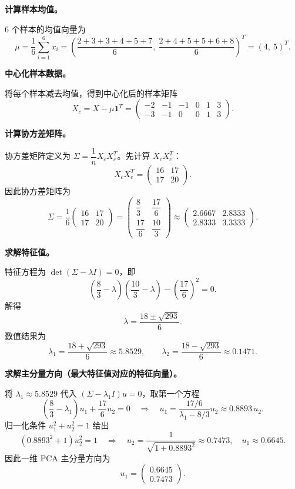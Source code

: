 \documentclass[a4, 10pt, comentarios]{aleph-notas}
\begin{document}
\textbf{计算样本均值。}

6 个样本的均值向量为
\[
    \mu=\frac{1}{6}\sum_{i=1}^{6}x_i
    =\left(\frac{2+3+3+4+5+7}{6},\ \frac{2+4+5+5+6+8}{6}\right)^T
    =\left(4,\ 5\right)^T.
\]

\textbf{中心化样本数据。}

将每个样本减去均值，得到中心化后的样本矩阵
\[
X_c=X-\mu\mathbf{1}^T=
\begin{pmatrix}
-2&-1&-1&0&1&3\\
-3&-1&0&0&1&3
\end{pmatrix}.
\]

\textbf{计算协方差矩阵。}

协方差矩阵定义为 $\Sigma=\dfrac{1}{n}X_cX_c^T$。先计算 $X_cX_c^T$：
\[
X_cX_c^T=
\begin{pmatrix}
16 & 17\\
17 & 20
\end{pmatrix}.
\]
因此协方差矩阵为
\[
\Sigma=\frac{1}{6}
\begin{pmatrix}
16 & 17\\
17 & 20
\end{pmatrix}
=
\begin{pmatrix}
\dfrac{8}{3} & \dfrac{17}{6}\\[6pt]
\dfrac{17}{6} & \dfrac{10}{3}
\end{pmatrix}
\approx
\begin{pmatrix}
2.6667 & 2.8333\\
2.8333 & 3.3333
\end{pmatrix}.
\]

\textbf{求解特征值。}

特征方程为 $\det(\Sigma-\lambda I)=0$，即
\[
\left(\frac{8}{3}-\lambda\right)\left(\frac{10}{3}-\lambda\right)-\left(\frac{17}{6}\right)^2=0.
\]
解得
\[
\lambda=\frac{18\pm\sqrt{293}}{6}.
\]
数值结果为
\[
\lambda_1=\frac{18+\sqrt{293}}{6}\approx5.8529,\qquad
\lambda_2=\frac{18-\sqrt{293}}{6}\approx0.1471.
\]

\textbf{求解主分量方向（最大特征值对应的特征向量）。}

将 $\lambda_1\approx5.8529$ 代入 $(\Sigma-\lambda_1 I)u=0$，取第一个方程
\[
\left(\frac{8}{3}-\lambda_1\right)u_1+\frac{17}{6}u_2=0
\quad\Rightarrow\quad
u_1=\frac{17/6}{\lambda_1-8/3}u_2\approx0.8893\,u_2.
\]
归一化条件 $u_1^2+u_2^2=1$ 给出
\[
(0.8893^2+1)u_2^2=1\quad\Rightarrow\quad
u_2=\frac{1}{\sqrt{1+0.8893^2}}\approx0.7473,\quad
u_1\approx0.6645.
\]
因此一维 PCA 主分量方向为
\[
u_1=\begin{pmatrix}0.6645\\0.7473\end{pmatrix}.
\]
\end{document}
